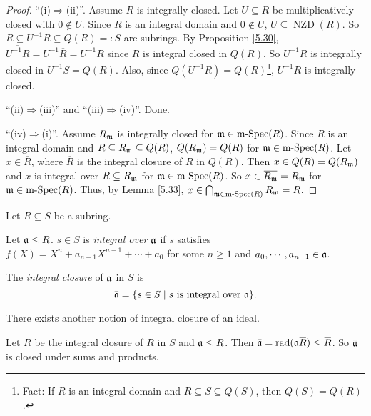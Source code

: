 \begin{proof}
    ``(i)$\Rightarrow$(ii)''. Assume $R$ is integrally closed. Let $U \subseteq R$ be multiplicatively closed with $0 \not \in U$. Since $R$ is an integral domain and $0 \not\in U$, $U \subseteq \operatorname{NZD}(R)$. So $R \subseteq U^{-1}R \subseteq Q(R) =: S$ are subrings. By Proposition \ref{5.30}, $\overbar{U^{-1}R} = U^{-1} \overbar{R} = U^{-1}R$ since $R$ is integral closed in $Q(R)$. So $U^{-1}R$ is integrally closed in $U^{-1}S = Q(R)$. Also, since $Q(U^{-1}R) = Q(R)$\footnote[2]{Fact: If $R$ is an integral domain and $R \subseteq S \subseteq Q(S)$, then $Q(S) = Q(R)$.}, $U^{-1}R$ is integrally closed. \par 
    ``(ii)$\Rightarrow$(iii)'' and ``(iii)$\Rightarrow$(iv)''. Done. \par
    ``(iv)$\Rightarrow$(i)''. Assume $R_{\mathfrak{m}}$ is integrally closed for $\mathfrak{m} \in \operatorname{m-Spec}(R)$. Since $R$ is an integral domain and $R \subseteq R_{\mathfrak{m}} \subseteq Q(R)$, $Q(R_{\mathfrak{m}}) = Q(R)$ for $\mathfrak{m} \in \operatorname{m-Spec}(R)$. Let $x \in \overbar{R}$, where $\overbar{R}$ is the integral closure of $R$ in $Q(R)$. Then $x \in Q(R) = Q(R_{\mathfrak{m}})$ and $x$ is integral over $R \subseteq R_{\mathfrak{m}}$ for $\mathfrak{m} \in \operatorname{m-Spec}(R)$. So $x \in \overbar{R_\ffm} = R_\ffm$ for $\mathfrak{m} \in \operatorname{m-Spec}(R)$. Thus, by Lemma \ref{5.33}, $x \in \bigcap_{\mathfrak{m} \in \operatorname{m-Spec}(R)}R_{\mathfrak{m}} = R$. 
\end{proof}

\noindent Let $R \subseteq S$ be a subring.

\begin{definition}\label{5.35}
    Let $\mathfrak{a} \leq R$. $s \in S$ is \emph{integral over $\mathfrak{a}$} if $s$ satisfies $f(X) = X^{n} + a_{n-1}X^{n-1} + \cdots + a_0$ for some $n \geq 1$ and $a_0,\cdots,a_{n-1} \in \mathfrak{a}$. \par 
    The \emph{integral closure} of $\mathfrak{a}$ in $S$ is 
    \[\overbar{\ffa} = \{s \in S \mid s \text{ is integral over $\ffa$}\}.\]
\end{definition}

\begin{warning}\label{5.36}
    There exists another notion of integral closure of an ideal.
\end{warning}

\begin{lemma}\label{5.37}
    Let $\overbar{R}$ be the integral closure of $R$ in $S$ and $\mathfrak{a} \leq R$. Then $\overbar{\ffa} = \operatorname{rad}(\ffa \overbar{R}) \leq \overbar{R}$. So $\overbar{\ffa}$ is closed under sums and products.
\end{lemma}

